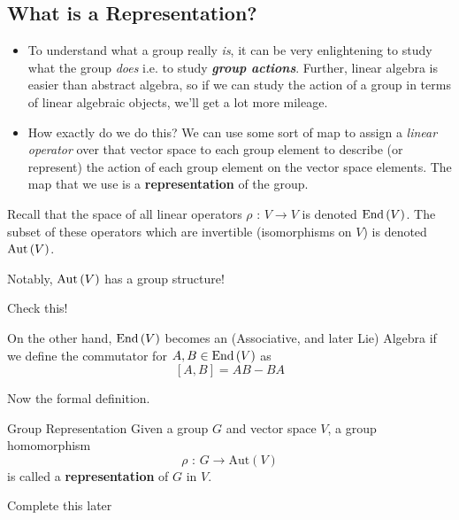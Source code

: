 \documentclass[11pt]{article}
\begin{document}
\subsection{What is a Representation?}
\begin{itemize}
    \item To understand what a group really \emph{is}, it can be very enlightening to study what the group \emph{does} i.e. to study \emph{\textbf{group actions}}. Further, linear algebra is easier than abstract algebra, so if we can study the action of a group in terms of linear algebraic objects, we'll get a lot more mileage.
    \item How exactly do we do this? We can use some sort of map to assign a \emph{linear operator} over that vector space to each group element to describe (or represent) the action of each group element on the vector space elements. The map that we use is a \textbf{representation} of the group.
\end{itemize}

\vskip 0.5cm
\begin{redbox}
  Recall that the space of all linear operators $\rho \text{ : } V \rightarrow V$ is denoted $\mathrm{End}\left(V\right)$. The subset of these operators which are invertible (isomorphisms on $V$) is denoted $\mathrm{Aut}\left(V\right)$. 
  
  \vskip 0.5cm
  Notably, $\mathrm{Aut}\left(V\right)$ has a group structure! \begin{thought}{Check this!} \end{thought} On the other hand, $\mathrm{End}\left(V\right)$ becomes an (Associative, and later Lie) Algebra if we define the commutator for $A, B \in \mathrm{End}\left(V\right)$ as
  \[ [A, B] = AB - BA \] 
  
\end{redbox}

\vskip 0.5cm
Now the formal definition.

\vskip 0.5cm
\begin{definition}{Group Representation}
  Given a group $G$ and vector space $V$, a group homomorphism \[ \rho \text{ : } G \rightarrow \mathrm{Aut}(V) \] is called a \textbf{representation} of $G$ in $V$.
\end{definition}

\begin{example}
  Complete this later
\end{example}

\vskip 0.5cm
\end{document}
